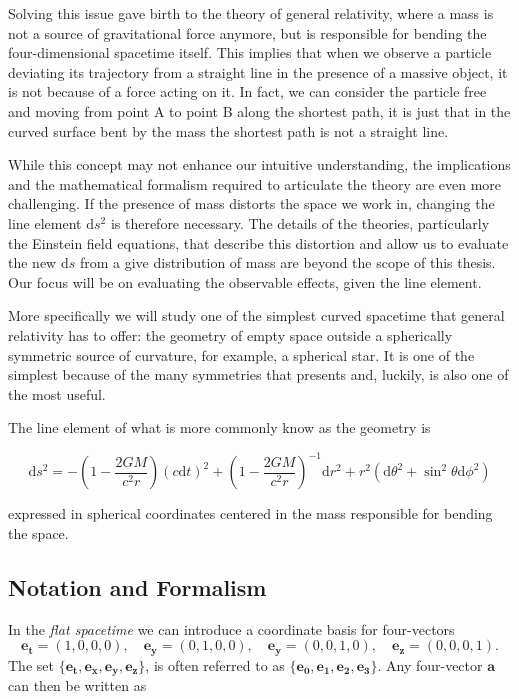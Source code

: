 Solving this issue gave birth to the theory of general relativity, where a mass
is not a source of gravitational force anymore, but is responsible for
bending the four-dimensional spacetime itself.
This implies that when we observe a particle deviating its trajectory from a
straight line in the presence of a massive object, it is not because of a force
acting on it.
In fact, we can consider the particle free and moving from point A to point B
along the shortest path, it is just that in the curved surface bent by the mass
the shortest path is not a straight line.

While this concept may not enhance our intuitive understanding, the
implications and the mathematical formalism required to articulate the theory
are even more challenging.
If the presence of mass distorts the space we work in, changing the line
element $\mathrm{d}s^2$ is therefore necessary.
The details of the theories, particularly the Einstein field equations, that
describe this distortion and allow us to evaluate the new $\mathrm{d}s$ from a
give distribution of mass are beyond the scope of this thesis.
Our focus will be on evaluating the observable effects, given the line
element.

More specifically we will study one of the simplest curved spacetime that
general relativity has to offer: the geometry of empty space outside a
spherically symmetric source of curvature, for example, a spherical
star.
It is one of the simplest because of the many symmetries that presents and,
luckily, is also one of the most useful.

The line element of what is more commonly know as the \Sh geometry is

\begin{equation*}
    \mathrm{d}s^2 = - \left(1 - \frac{2 G M}{c^2 r} \right) (c \mathrm{d}t)^2
    + \left(1 - \frac{2 G M}{c^2 r} \right)^{-1} \mathrm{d}r^2
    + r^2 (\mathrm{d}\theta^2 + \sin^2 \theta \mathrm{d}\phi^2)
\end{equation*}

expressed in spherical coordinates centered in the mass responsible for bending
the space.

\newpage


\subsection{Notation and Formalism}
\label{cap1:ssec:notation}

In the \textit{flat spacetime} we can introduce a coordinate basis for
four-vectors
\begin{equation}
    \mathbf{e_t} = (1,0,0,0), \quad
    \mathbf{e_y} = (0,1,0,0), \quad
    \mathbf{e_y} = (0,0,1,0), \quad
    \mathbf{e_z} = (0,0,0,1).
    \label{cap1:eq:coord_base}
\end{equation}
The set 
$\{ \mathbf{e_t}, \mathbf{e_x}, \mathbf{e_y}, \mathbf{e_z} \}$, is often
referred to as $\{ \mathbf{e_0}, \mathbf{e_1}, \mathbf{e_2}, \mathbf{e_3} \}$.
Any four-vector $\textbf{a}$ can then be written as

